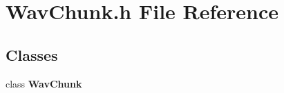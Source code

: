 \section{Wav\+Chunk.\+h File Reference}
\label{WavChunk_8h}
\subsection*{Classes}
\begin{DoxyCompactItemize}
\item 
class \textbf{ Wav\+Chunk}
\end{DoxyCompactItemize}
